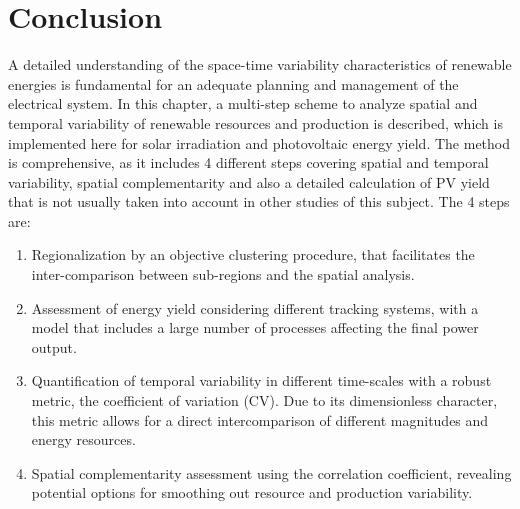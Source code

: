 
\section{Conclusion}
A detailed understanding of the space-time variability characteristics of renewable energies is fundamental for an adequate planning and management of the electrical system. In this chapter, a multi-step scheme to analyze spatial and temporal variability of renewable resources and production is described, which is implemented here for solar irradiation and photovoltaic energy yield. The method is comprehensive, as it includes 4 different steps covering spatial and temporal variability, spatial complementarity and also a detailed calculation of PV yield that is not usually taken into account in other studies of this subject. The 4 steps are:
\begin{enumerate}
\item Regionalization by an objective clustering procedure, that facilitates the inter-comparison between sub-regions and the spatial analysis. 
\item Assessment of energy yield considering different tracking systems, with a model that includes a large number of processes affecting the final power output.
\item Quantification of temporal variability in different time-scales with a robust metric, the coefficient of variation (CV). Due to its dimensionless character, this metric allows for a direct intercomparison of different magnitudes and energy resources.
\item Spatial complementarity assessment using the correlation coefficient, revealing potential options for smoothing out resource and production variability.
\end{enumerate}

